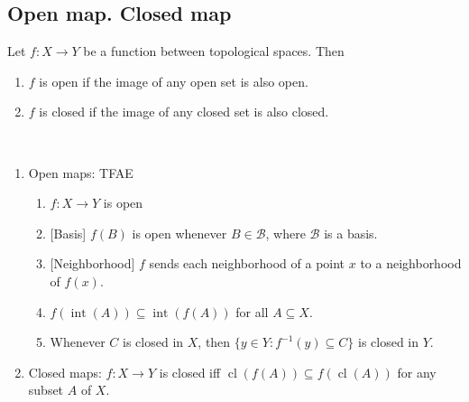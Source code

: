 \documentclass{treatise}
\begin{document}
\subsection{Open map. Closed map}
Let $f: X \to Y$ be a function between topological spaces. Then
\begin{enumerate}
    \item $f$ is open if the image of any open set is also open.
    \item $f$ is closed if the image of any closed set is also closed.
\end{enumerate}
\begin{proposition} \ 
\begin{enumerate}
    \item Open maps: TFAE
    \begin{enumerate}
        \item $f: X \to Y$ is open
        \item {[Basis]} $f(B)$ is open whenever $B \in \mathcal{B}$, where $\mathcal{B}$ is a basis.
        \item {[Neighborhood]} $f$ sends each neighborhood of a point $x$ to a neighborhood of $f(x)$.
        \item $f(\operatorname{int}(A)) \subseteq \operatorname{int}(f(A))$ for all $A \subseteq X$.
        \item Whenever $C$ is closed in $X$, then $\{ y \in Y : f^{-1}(y) \subseteq C \}$ is closed in $Y$.
    \end{enumerate}
    \item Closed maps: $f: X \to Y$ is closed iff $\operatorname{cl}(f(A)) \subseteq f(\operatorname{cl}(A))$ for any subset $A$ of $X$.
\end{enumerate}
\end{proposition}
\end{document}
